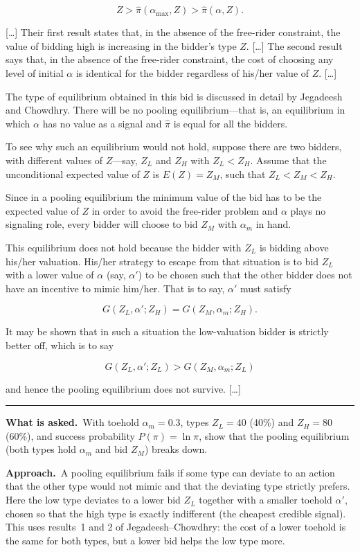 \documentclass[11pt,a4paper]{article}
\newcommand{\asked}{\par\medskip\noindent\textbf{What is asked.}~}
\newcommand{\approach}{\par\smallskip\noindent\textbf{Approach.}~}
\newcommand{\stmtend}{\par\endgroup\nopagebreak\noindent\rule{\linewidth}{0.4pt}\par\medskip}
\begin{document}
\[Z > \hat\pi(\alpha_{\max}, Z) > \hat\pi(\alpha, Z).\]

{[}\ldots{]} Their first result states that, in the absence of the free-rider constraint, the value
of bidding high is increasing in the bidder's type \(Z\). {[}\ldots{]} The second result says that,
in the absence of the free-rider constraint, the cost of choosing any level of initial \(\alpha\) is
identical for the bidder regardless of his/her value of \(Z\). {[}\ldots{]}

The type of equilibrium obtained in this bid is discussed in detail by Jegadeesh and Chowdhry. There
will be no pooling equilibrium---that is, an equilibrium in which \(\alpha\) has no value as a
signal and \(\hat\pi\) is equal for all the bidders.

To see why such an equilibrium would not hold, suppose there are two bidders, with different values
of \(Z\)---say, \(Z_L\) and \(Z_H\) with \(Z_L < Z_H\). Assume that the unconditional expected value
of \(Z\) is \(E(Z) = Z_M\), such that \(Z_L < Z_M < Z_H\).

Since in a pooling equilibrium the minimum value of the bid has to be the expected value of \(Z\) in
order to avoid the free-rider problem and \(\alpha\) plays no signaling role, every bidder will
choose to bid \(Z_M\) with \(\alpha_m\) in hand.

This equilibrium does not hold because the bidder with \(Z_L\) is bidding above his/her valuation.
His/her strategy to escape from that situation is to bid \(Z_L\) with a lower value of \(\alpha\)
(say, \(\alpha'\)) to be chosen such that the other bidder does not have an incentive to mimic
him/her. That is to say, \(\alpha'\) must satisfy

\[G(Z_L, \alpha'; Z_H) = G(Z_M, \alpha_m; Z_H).\]

It may be shown that in such a situation the low-valuation bidder is strictly better off, which is
to say

\[G(Z_L, \alpha'; Z_L) > G(Z_M, \alpha_m; Z_L)\]

and hence the pooling equilibrium does not survive. {[}\ldots{]}
\stmtend

\asked With toehold $\alpha_m=0.3$, types $Z_L=40$ (40\%) and $Z_H=80$ (60\%), and success probability
$P(\pi)=\ln\pi$, show that the pooling equilibrium (both types hold $\alpha_m$ and bid $Z_M$) breaks down.

\approach A pooling equilibrium fails if some type can deviate to an action that the other type would
not mimic and that the deviating type strictly prefers. Here the low type deviates to a lower bid
$Z_L$ together with a smaller toehold $\alpha'$, chosen so that the high type is exactly indifferent
(the cheapest credible signal). This uses results~1 and 2 of Jegadeesh--Chowdhry: the cost of a lower
toehold is the same for both types, but a lower bid helps the low type more.
\end{document}

